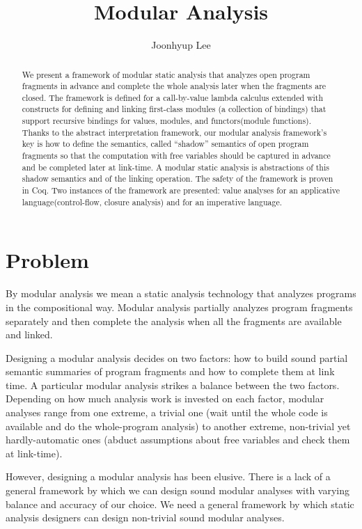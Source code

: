 \documentclass{article}
\title{Modular Analysis}
\author{Joonhyup Lee}
\begin{document}
\maketitle
\begin{abstract}
  We present a framework of modular static analysis that analyzes open
  program fragments in advance and complete the whole analysis later
  when the fragments are closed. The framework is defined for a
  call-by-value lambda calculus extended with constructs for defining and
  linking first-class modules (a collection of bindings) that support
  recursive bindings for values, modules, and functors(module
  functions). Thanks to the abstract interpretation framework, our
  modular analysis framework's key is how to define the semantics,
  called ``shadow'' semantics of open program fragments so that the
  computation with free variables should be captured in advance
  and be completed later at link-time. A modular
  static analysis is abstractions of this shadow semantics and of the
  linking operation. The safety of the framework is proven in Coq.
  Two instances of the framework are presented: value analyses for an
  applicative language(control-flow, closure analysis) and for
  an imperative language.
\end{abstract}

\section{Problem}
By modular analysis we mean a static analysis technology that analyzes
programs in the compositional way. Modular analysis partially analyzes
program fragments separately and then complete the analysis when all
the fragments are available and linked.

Designing a modular analysis decides on two factors: how to build
sound partial semantic summaries of program fragments and how to
complete them at link time. A particular modular analysis strikes a
balance between the two factors. Depending on how much analysis work
is invested on each factor, modular analyses range from one extreme, a
trivial one (wait until the whole code is available and do the
whole-program analysis) to another extreme, non-trivial yet
hardly-automatic ones (abduct assumptions about free variables and
check them at link-time).

However, designing a modular analysis has been elusive. There is a
lack of a general framework by which we can design sound modular
analyses with varying balance and accuracy of our choice.
We need a general framework by which static analysis designers can
design non-trivial sound modular analyses.
\end{document}
